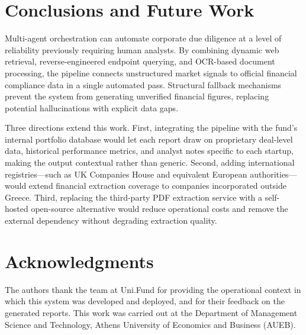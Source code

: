 \documentclass[12pt]{article}
\begin{document}
\section{Conclusions and Future Work}
\label{sec:conclusion}

Multi-agent orchestration can automate corporate due diligence at a level of reliability
previously requiring human analysts. By combining dynamic web retrieval, reverse-engineered
endpoint querying, and OCR-based document processing, the pipeline connects unstructured market
signals to official financial compliance data in a single automated pass. Structural fallback
mechanisms prevent the system from generating unverified financial figures, replacing potential
hallucinations with explicit data gaps.

Three directions extend this work. First, integrating the pipeline with the fund's internal
portfolio database would let each report draw on proprietary deal-level data, historical
performance metrics, and analyst notes specific to each startup, making the output contextual
rather than generic. Second, adding international registries---such as UK Companies House
\parencite{companieshouse2025} and equivalent European authorities---would extend financial
extraction coverage to companies incorporated outside Greece. Third, replacing the third-party PDF
extraction service with a self-hosted open-source alternative would reduce operational costs and
remove the external dependency without degrading extraction quality.

\section*{Acknowledgments}

The authors thank the team at Uni.Fund for providing the operational context in which this system
was developed and deployed, and for their feedback on the generated reports. This work was carried
out at the Department of Management Science and Technology, Athens University of Economics and
Business (AUEB).

\printbibliography
\end{document}
